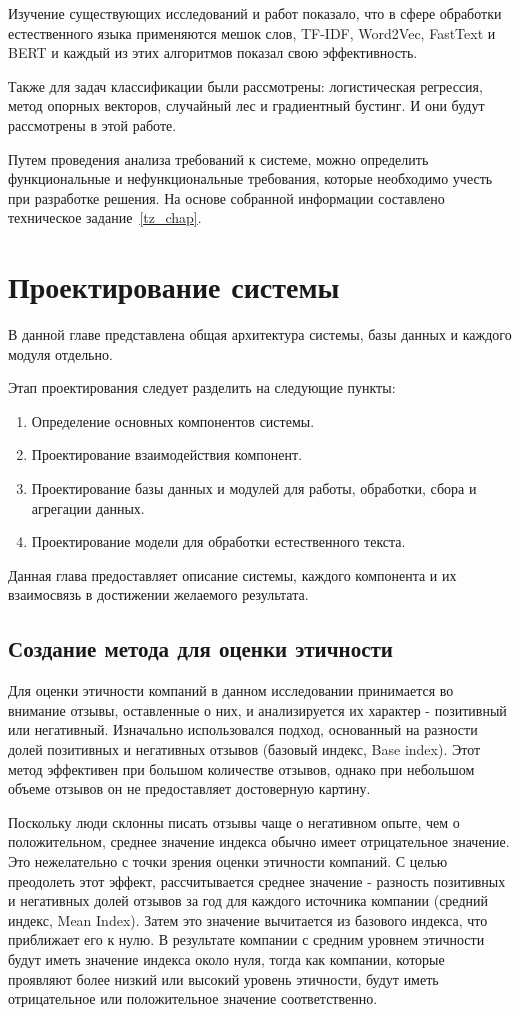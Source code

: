 \documentclass[PI, VKR]{HSEUniversity}
\begin{document}
Изучение существующих исследований и работ показало, что в сфере обработки естественного языка применяются мешок слов, TF-IDF, Word2Vec, FastText и BERT и каждый из этих алгоритмов показал свою эффективность.

Также для задач классификации были рассмотрены: логистическая регрессия, метод опорных векторов, случайный лес и градиентный бустинг. И они будут рассмотрены в этой работе.

Путем проведения анализа требований к системе, можно определить функциональные и нефункциональные требования, которые необходимо учесть при разработке решения. На основе собранной информации составлено техническое задание~\ref{tz_chap}.
\chapter{Проектирование системы}
\label{sec:orgcab4285}
В данной главе представлена общая архитектура системы, базы данных и каждого модуля отдельно.

Этап проектирования следует разделить на следующие пункты:
\begin{enumerate}
\item Определение основных компонентов системы.
\item Проектирование взаимодействия компонент.
\item Проектирование базы данных и модулей для работы, обработки, сбора и агрегации данных.
\item Проектирование модели для обработки естественного текста.
\end{enumerate}

Данная глава предоставляет описание системы, каждого компонента и их взаимосвязь в достижении желаемого результата.
\section{Создание метода для оценки этичности}
\label{sec:orgf65d21f}
Для оценки этичности компаний в данном исследовании принимается во внимание отзывы, оставленные о них, и анализируется их характер - позитивный или негативный. Изначально использовался подход, основанный на разности долей позитивных и негативных отзывов (базовый индекс, Base index). Этот метод эффективен при большом количестве отзывов, однако при небольшом объеме отзывов он не предоставляет достоверную картину.

Поскольку люди склонны писать отзывы чаще о негативном опыте, чем о положительном, среднее значение индекса обычно имеет отрицательное значение. Это нежелательно с точки зрения оценки этичности компаний. С целью преодолеть этот эффект, рассчитывается среднее значение - разность позитивных и негативных долей отзывов за год для каждого источника компании (средний индекс, Mean Index). Затем это значение вычитается из базового индекса, что приближает его к нулю. В результате компании с средним уровнем этичности будут иметь значение индекса около нуля, тогда как компании, которые проявляют более низкий или высокий уровень этичности, будут иметь отрицательное или положительное значение соответственно.
\end{document}
